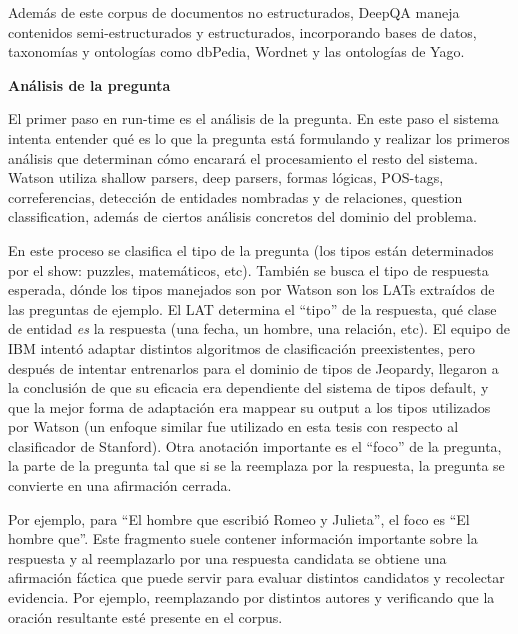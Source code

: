 Además de este corpus de documentos no estructurados, DeepQA maneja
contenidos semi-estructurados  y estructurados, incorporando bases de
datos, taxonomías y ontologías como dbPedia, Wordnet y las
ontologías de Yago.\newline 

\textbf{Análisis de la pregunta}\newline

El primer paso en run-time es el análisis de la pregunta. En este paso
el sistema intenta entender qué es lo que la pregunta está
formulando y realizar los primeros análisis que determinan cómo
encarará el procesamiento el resto del sistema. Watson utiliza
shallow parsers, deep parsers, formas lógicas, POS-tags,
correferencias, detección de entidades nombradas y de relaciones,
question classification, además de ciertos análisis concretos del
dominio del problema.

En este proceso se clasifica el tipo de la pregunta (los tipos están
determinados por el show: puzzles, matemáticos, etc). También se
busca el tipo de respuesta esperada, dónde los tipos manejados son
por Watson son los LATs extraídos de las preguntas de ejemplo. El LAT
determina el {\textquotedblleft}tipo{\textquotedblright} de la
respuesta, qué clase de entidad \textit{es} la respuesta (una fecha, un
hombre, una relación, etc). El equipo de IBM intentó adaptar
distintos algoritmos de clasificación preexistentes, pero después
de intentar entrenarlos para el dominio de tipos de Jeopardy, llegaron
a la conclusión de que su eficacia era dependiente del  sistema de
tipos default, y que la mejor forma de adaptación era mappear su
output a los tipos utilizados por Watson (un enfoque similar fue
utilizado en esta tesis con respecto al clasificador de Stanford). Otra
anotación importante es el
{\textquotedblleft}foco{\textquotedblright} de la pregunta, la parte de
la pregunta tal que si se la reemplaza por la respuesta, la pregunta se
convierte en una afirmación cerrada.

Por ejemplo, para {\textquotedblleft}El hombre que escribió Romeo y
Julieta{\textquotedblright}, el foco es {\textquotedblleft}El hombre
que{\textquotedblright}. Este fragmento suele contener información
importante sobre la respuesta y al reemplazarlo por una respuesta
candidata se obtiene una afirmación fáctica que puede servir para
evaluar distintos candidatos y recolectar evidencia. Por ejemplo,
reemplazando por distintos autores y verificando que la oración
resultante esté presente en el corpus.

